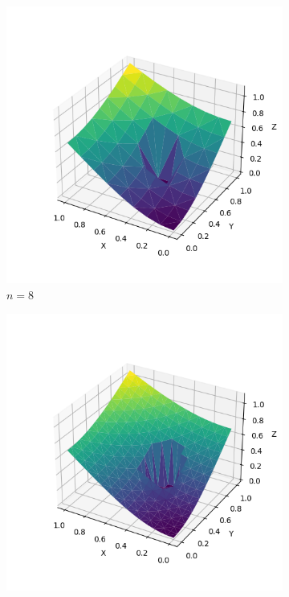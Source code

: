 \documentclass[lang=cn,a4paper,newtx,bibend=bibtex]{elegantpaper}
\begin{document}
\begin{figure}[H]
  \centering
  \begin{subfigure}[b]{0.18\textwidth}
      \includegraphics[width=\textwidth]{../../res_bac/res-[data|3-Neumann-irregular-a8].png}
      \caption{$n =  8$}
  \end{subfigure}
  \hfill
  \begin{subfigure}[b]{0.18\textwidth}
      \includegraphics[width=\textwidth]{../../res_bac/res-[data|3-Neumann-irregular-b16].png}

\end{subfigure}
\end{figure}
\end{document}
